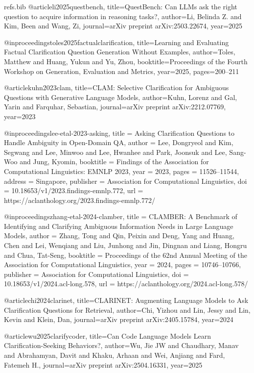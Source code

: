 \begin{filecontents*}{refs.bib}
@article{li2025questbench,
  title={QuestBench: Can LLMs ask the right question to acquire information in reasoning tasks?},
  author={Li, Belinda Z. and Kim, Been and Wang, Zi},
  journal={arXiv preprint arXiv:2503.22674},
  year={2025}
}

@inproceedings{toles2025factualclarification,
  title={Learning and Evaluating Factual Clarification Question Generation Without Examples},
  author={Toles, Matthew and Huang, Yukun and Yu, Zhou},
  booktitle={Proceedings of the Fourth Workshop on Generation, Evaluation and Metrics},
  year={2025},
  pages={200--211}
}

@article{kuhn2023clam,
  title={CLAM: Selective Clarification for Ambiguous Questions with Generative Language Models},
  author={Kuhn, Lorenz and Gal, Yarin and Farquhar, Sebastian},
  journal={arXiv preprint arXiv:2212.07769},
  year={2023}
}

@inproceedings{lee-etal-2023-asking,
  title = {Asking Clarification Questions to Handle Ambiguity in Open-Domain QA},
  author = {Lee, Dongryeol and Kim, Segwang and Lee, Minwoo and Lee, Hwanhee and Park, Joonsuk and Lee, Sang-Woo and Jung, Kyomin},
  booktitle = {Findings of the Association for Computational Linguistics: EMNLP 2023},
  year = {2023},
  pages = {11526--11544},
  address = {Singapore},
  publisher = {Association for Computational Linguistics},
  doi = {10.18653/v1/2023.findings-emnlp.772},
  url = {https://aclanthology.org/2023.findings-emnlp.772/}
}

@inproceedings{zhang-etal-2024-clamber,
  title = {CLAMBER: A Benchmark of Identifying and Clarifying Ambiguous Information Needs in Large Language Models},
  author = {Zhang, Tong and Qin, Peixin and Deng, Yang and Huang, Chen and Lei, Wenqiang and Liu, Junhong and Jin, Dingnan and Liang, Hongru and Chua, Tat-Seng},
  booktitle = {Proceedings of the 62nd Annual Meeting of the Association for Computational Linguistics},
  year = {2024},
  pages = {10746--10766},
  publisher = {Association for Computational Linguistics},
  doi = {10.18653/v1/2024.acl-long.578},
  url = {https://aclanthology.org/2024.acl-long.578/}
}

@article{chi2024clarinet,
  title={CLARINET: Augmenting Language Models to Ask Clarification Questions for Retrieval},
  author={Chi, Yizhou and Lin, Jessy and Lin, Kevin and Klein, Dan},
  journal={arXiv preprint arXiv:2405.15784},
  year={2024}
}

@article{wu2025clarifycoder,
  title={Can Code Language Models Learn Clarification-Seeking Behaviors?},
  author={Wu, Jie JW and Chaudhary, Manav and Abrahamyan, Davit and Khaku, Arhaan and Wei, Anjiang and Fard, Fatemeh H.},
  journal={arXiv preprint arXiv:2504.16331},
  year={2025}
}


\end{filecontents*}
